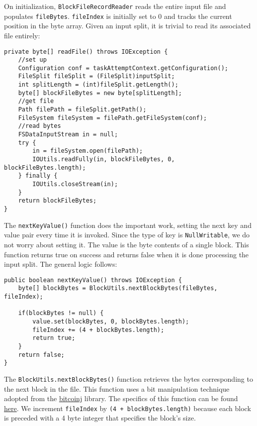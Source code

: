 \documentclass[9pt,twocolumn,twoside]{idsi}
\begin{document}
On initialization, \lstinline{BlockFileRecordReader} reads the entire input file and populates \lstinline{fileBytes}. \lstinline{fileIndex} is initially set to 0 and tracks the current position in the byte array. Given an input split, it is trivial to read its associated file entirely:

\begin{lstlisting}
private byte[] readFile() throws IOException {
    //set up
    Configuration conf = taskAttemptContext.getConfiguration();
    FileSplit fileSplit = (FileSplit)inputSplit;
    int splitLength = (int)fileSplit.getLength();
    byte[] blockFileBytes = new byte[splitLength];
    //get file
    Path filePath = fileSplit.getPath();
    FileSystem fileSystem = filePath.getFileSystem(conf);
    //read bytes
    FSDataInputStream in = null;
    try {
        in = fileSystem.open(filePath);
        IOUtils.readFully(in, blockFileBytes, 0, blockFileBytes.length);
    } finally {
        IOUtils.closeStream(in);
    }
    return blockFileBytes;
}
\end{lstlisting}

The \lstinline{nextKeyValue()} function does the important work, setting the next key and value pair every time it is invoked. Since the type of key is \lstinline{NullWritable}, we do not worry about setting it. The value is the byte contents of a single block. This function returns true on success and returns false when it is done processing the input split. The general logic follows:

\begin{lstlisting}
public boolean nextKeyValue() throws IOException {
    byte[] blockBytes = BlockUtils.nextBlockBytes(fileBytes, fileIndex);

    if(blockBytes != null) {
        value.set(blockBytes, 0, blockBytes.length);
        fileIndex += (4 + blockBytes.length);
        return true;
    }
    return false;
}
\end{lstlisting}

The \lstinline{BlockUtils.nextBlockBytes()} function retrieves the bytes corresponding to the next block in the file. This function uses a bit manipulation technique adopted from the \href{https://bitcoinj.github.io/}{bitcoinj} library. The specifics of this function can be found \href{https://github.com/nishilshah17/idsi_bitcoin/blob/97859e4f8284f2fc5c1db488d61d075af9ea256d/reduce_blockchain/blockparser/BlockUtils.java#L30}{here}. We increment \lstinline{fileIndex} by \lstinline{(4 + blockBytes.length)} because each block is preceded with a 4 byte integer that specifies the block's size.
\end{document}
